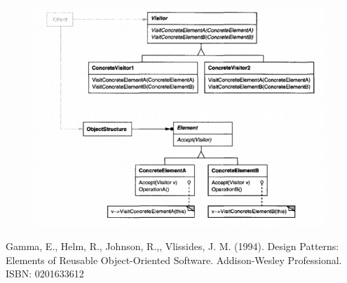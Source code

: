 \documentclass{article}
\begin{document}
\begin{figure}[h]
    \centering
    \includegraphics[width=11cm]{diagrams/pattern-23-visitor.png}
\end{figure}

\begin{thebibliography}{}
\bibitem{}
Gamma, E., Helm, R., Johnson, R.,, Vlissides, J. M. (1994). Design Patterns: Elements of Reusable Object-Oriented Software. Addison-Wesley Professional. ISBN: 0201633612

\end{thebibliography}
\end{document}
